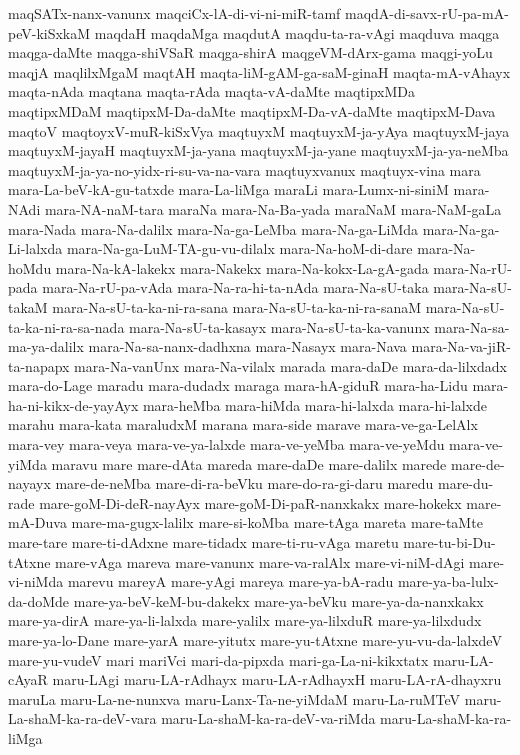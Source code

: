 {maqSATx-nanx-vanunx
maqciCx-lA-di-vi-ni-miR-tamf
maqdA-di-savx-rU-pa-mA-peV-kiSxkaM
maqdaH
maqdaMga
maqdutA
maqdu-ta-ra-vAgi
maqduva
maqga
maqga-daMte
maqga-shiVSaR
maqga-shirA
maqgeVM-dArx-gama
maqgi-yoLu
maqjA
maqlilxMgaM
maqtAH
maqta-liM-gAM-ga-saM-ginaH
maqta-mA-vAhayx
maqta-nAda
maqtana
maqta-rAda
maqta-vA-daMte
maqtipxMDa
maqtipxMDaM
maqtipxM-Da-daMte
maqtipxM-Da-vA-daMte
maqtipxM-Dava
maqtoV
maqtoyxV-muR-kiSxVya
maqtuyxM
maqtuyxM-ja-yAya
maqtuyxM-jaya
maqtuyxM-jayaH
maqtuyxM-ja-yana
maqtuyxM-ja-yane
maqtuyxM-ja-ya-neMba
maqtuyxM-ja-ya-no-yidx-ri-su-va-na-vara
maqtuyxvanux
maqtuyx-vina
mara
mara-La-beV-kA-gu-tatxde
mara-La-liMga
maraLi
mara-Lumx-ni-siniM
mara-NAdi
mara-NA-naM-tara
maraNa
mara-Na-Ba-yada
maraNaM
mara-NaM-gaLa
mara-Nada
mara-Na-dalilx
mara-Na-ga-LeMba
mara-Na-ga-LiMda
mara-Na-ga-Li-lalxda
mara-Na-ga-LuM-TA-gu-vu-dilalx
mara-Na-hoM-di-dare
mara-Na-hoMdu
mara-Na-kA-lakekx
mara-Nakekx
mara-Na-kokx-La-gA-gada
mara-Na-rU-pada
mara-Na-rU-pa-vAda
mara-Na-ra-hi-ta-nAda
mara-Na-sU-taka
mara-Na-sU-takaM
mara-Na-sU-ta-ka-ni-ra-sana
mara-Na-sU-ta-ka-ni-ra-sanaM
mara-Na-sU-ta-ka-ni-ra-sa-nada
mara-Na-sU-ta-kasayx
mara-Na-sU-ta-ka-vanunx
mara-Na-sa-ma-ya-dalilx
mara-Na-sa-nanx-dadhxna
mara-Nasayx
mara-Nava
mara-Na-va-jiR-ta-napapx
mara-Na-vanUnx
mara-Na-vilalx
marada
mara-daDe
mara-da-lilxdadx
mara-do-Lage
maradu
mara-dudadx
maraga
mara-hA-giduR
mara-ha-Lidu
mara-ha-ni-kikx-de-yayAyx
mara-heMba
mara-hiMda
mara-hi-lalxda
mara-hi-lalxde
marahu
mara-kata
maraludxM
marana
mara-side
marave
mara-ve-ga-LelAlx
mara-vey
mara-veya
mara-ve-ya-lalxde
mara-ve-yeMba
mara-ve-yeMdu
mara-ve-yiMda
maravu
mare
mare-dAta
mareda
mare-daDe
mare-dalilx
marede
mare-de-nayayx
mare-de-neMba
mare-di-ra-beVku
mare-do-ra-gi-daru
maredu
mare-du-rade
mare-goM-Di-deR-nayAyx
mare-goM-Di-paR-nanxkakx
mare-hokekx
mare-mA-Duva
mare-ma-gugx-lalilx
mare-si-koMba
mare-tAga
mareta
mare-taMte
mare-tare
mare-ti-dAdxne
mare-tidadx
mare-ti-ru-vAga
maretu
mare-tu-bi-Du-tAtxne
mare-vAga
mareva
mare-vanunx
mare-va-ralAlx
mare-vi-niM-dAgi
mare-vi-niMda
marevu
mareyA
mare-yAgi
mareya
mare-ya-bA-radu
mare-ya-ba-lulx-da-doMde
mare-ya-beV-keM-bu-dakekx
mare-ya-beVku
mare-ya-da-nanxkakx
mare-ya-dirA
mare-ya-li-lalxda
mare-yalilx
mare-ya-lilxduR
mare-ya-lilxdudx
mare-ya-lo-Dane
mare-yarA
mare-yitutx
mare-yu-tAtxne
mare-yu-vu-da-lalxdeV
mare-yu-vudeV
mari
mariVci
mari-da-pipxda
mari-ga-La-ni-kikxtatx
maru-LA-cAyaR
maru-LAgi
maru-LA-rAdhayx
maru-LA-rAdhayxH
maru-LA-rA-dhayxru
maruLa
maru-La-ne-nunxva
maru-Lanx-Ta-ne-yiMdaM
maru-La-ruMTeV
maru-La-shaM-ka-ra-deV-vara
maru-La-shaM-ka-ra-deV-va-riMda
maru-La-shaM-ka-ra-liMga
}
